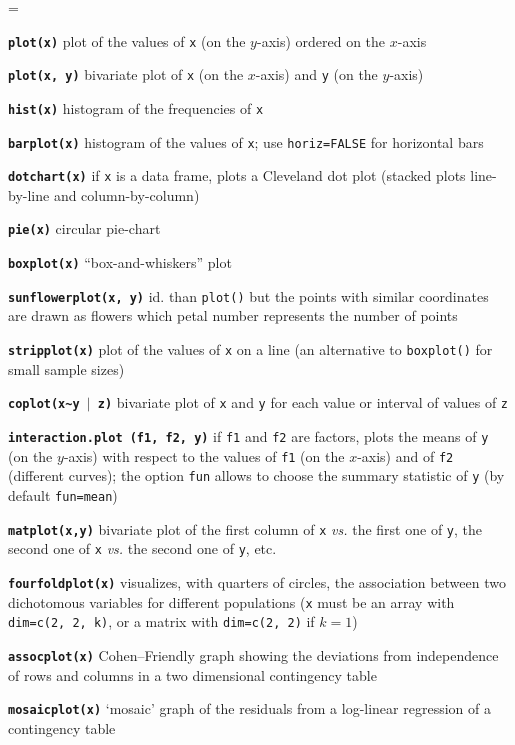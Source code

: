 \documentclass[10pt,landscape]{article}
\newcommand{\code}{\texttt}
\newcommand{\bcode}[1]{\texttt{\textbf{#1}}}
\begin{document}
\begin{multicols*}{3}
\everypar={\hangindent=9mm}

\bcode{plot(x)}  plot of the values of \code{x} (on the $y$-axis) ordered on the $x$-axis

\bcode{plot(x, y)}  bivariate plot of \code{x} (on the $x$-axis) and \code{y} (on the $y$-axis)

\bcode{hist(x)}  histogram of the frequencies of \code{x}

\bcode{barplot(x)}  histogram of the values of \code{x}; use
\code{horiz=FALSE} for horizontal bars

\bcode{dotchart(x)}  if \code{x} is a data frame, plots a Cleveland dot plot (stacked plots line-by-line and column-by-column)

\bcode{pie(x)}  circular pie-chart

\bcode{boxplot(x)}  ``box-and-whiskers'' plot

\bcode{sunflowerplot(x, y)}  id. than \code{plot()} but the points with similar coordinates are drawn as flowers which petal number represents the number of points

\bcode{stripplot(x)}  plot of the values of \code{x} on a line (an alternative to \code{boxplot()} for small sample sizes)

\bcode{coplot(x\~{}y $\mid$ z)}  bivariate plot of \code{x} and \code{y} for each value or interval of values of \code{z}

\bcode{interaction.plot (f1, f2, y)}  if \code{f1} and \code{f2} are factors, plots the means of \code{y} (on the $y$-axis) with respect to the values of \code{f1} (on the $x$-axis) and of \code{f2} (different curves); the option \code{fun} allows to choose the summary statistic of \code{y} (by default \code{fun=mean})

\bcode{matplot(x,y)}  bivariate plot of the first column of \code{x} {\it vs.} the first one of \code{y}, the second one of \code{x} {\it vs.} the second one of \code{y}, etc.

\bcode{fourfoldplot(x)}  visualizes, with quarters of circles, the association between two dichotomous variables for different populations (\code{x} must be an array with \code{dim=c(2, 2, k)}, or a matrix with \code{dim=c(2, 2)} if $k=1$)

\bcode{assocplot(x)}  Cohen--Friendly graph showing the deviations  from independence of rows and columns in a two dimensional contingency table

\bcode{mosaicplot(x)}  `mosaic' graph of the residuals from a log-linear regression of a contingency table


\end{multicols*}
\end{document}
